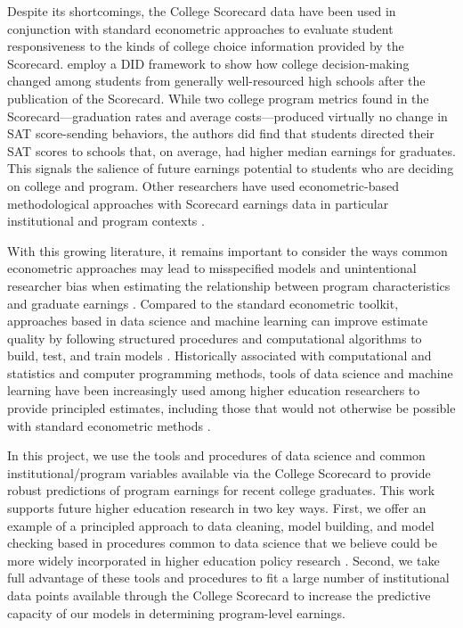 \documentclass[a4paper, 12pt]{article}
\begin{document}
Despite its shortcomings, the College Scorecard data have been used in conjunction with standard econometric approaches to evaluate student responsiveness to the kinds of college choice information provided by the Scorecard. \textcite{hurwitz_student_2018} employ a DID framework to show how college decision-making changed among students from generally well-resourced high schools after the publication of the Scorecard. While two college program metrics found in the Scorecard---graduation rates and average costs---produced virtually no change in SAT score-sending behaviors, the authors did find that students directed their SAT scores to schools that, on average, had higher median earnings for graduates. This signals the salience of future earnings potential to students who are deciding on college and program. Other researchers have used econometric-based methodological approaches with Scorecard earnings data in particular institutional and program contexts \parencite{boland_effect_2021, elu_earnings_2019, mabel_value_2020, seaman_assessing_2017}.

With this growing literature, it remains important to consider the ways common econometric approaches may lead to misspecified models and unintentional researcher bias when estimating the relationship between program characteristics and graduate earnings \parencite{Imbens_2004}. Compared to the standard econometric toolkit, approaches based in data science and machine learning can improve estimate quality by following structured procedures and computational algorithms to build, test, and train models \parencite{Hastie_etal_2016}. Historically associated with computational and statistics and computer programming methods, tools of data science and machine learning have been increasingly used among higher education researchers to provide principled estimates, including those that would not otherwise be possible with standard econometric methods \parencite{skinner2021civic, aulck2017predicting, savvas_etal_2021, Zeineddine_2021}.

In this project, we use the tools and procedures of data science and common institutional/program variables available via the College Scorecard to provide robust predictions of program earnings for recent college graduates. This work supports future higher education research in two key ways. First, we offer an example of a principled approach to data cleaning, model building, and model checking based in procedures common to data science that we believe could be more widely incorporated in higher education policy research \parencite{Kuhn_Silge_2022}. Second, we take full advantage of these tools and procedures to fit a large number of institutional data points available through the College Scorecard to increase the predictive capacity of our models in determining program-level earnings.
\end{document}
